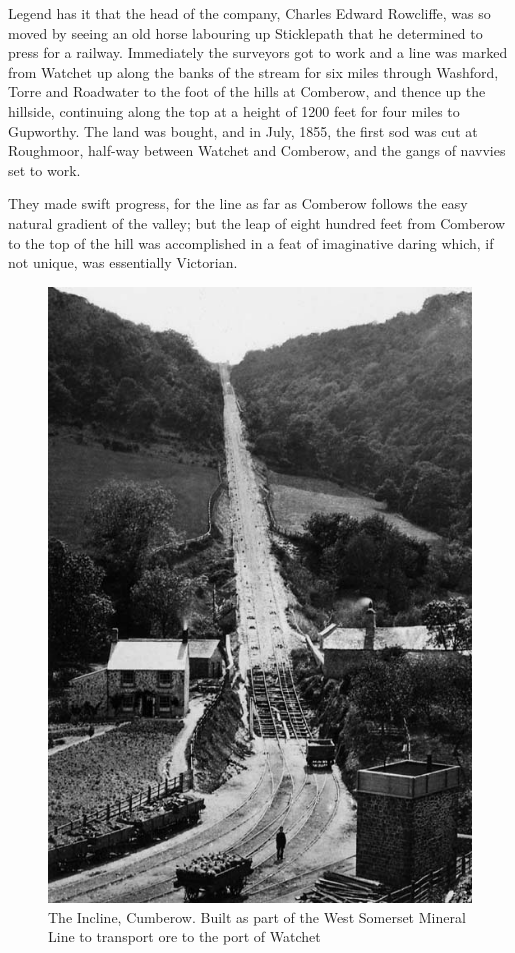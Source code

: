 Legend has it that the head of the company, Charles Edward Rowcliffe, was so moved by seeing an old horse labouring up Sticklepath that he determined to press for a railway. Immediately the surveyors got to work and a line was marked from Watchet up along the banks of the stream for six miles through Washford, Torre and Roadwater to the foot of the hills at Comberow, and thence up the hillside, continuing along the top at a height of 1200 feet for four miles to Gupworthy. The land was bought, and in July, 1855, the first sod was cut at Roughmoor, half-way between Watchet and Comberow, and the gangs of navvies set to work. 

They made swift progress, for the line as far as Comberow follows the easy natural gradient of the valley; but the leap of eight hundred feet from Comberow to the top of the hill was accomplished in a feat of imaginative daring which, if not unique, was essentially Victorian.

\begin{figure}
	 \centering
     \includegraphics[width=1\textwidth]{figures/comberowIncline}
     \caption{The Incline, Cumberow. Built as part of the West Somerset Mineral Line to transport ore to the port of Watchet}
     \label{fig:Comberow}
\end{figure}

